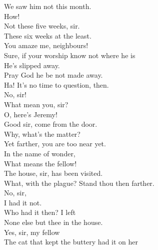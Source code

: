 \documentclass[a4paper,oneside,12pt]{memoir}
\begin{document}
\begin{drama*}
We saw him not this month.\\
\lovewitspeaks {} How!\\
\neighthreespeaks {} Not these five weeks, sir.\\
\neightwospeaks These six weeks at the least.\\
\lovewitspeaks {} You amaze me, neighbours!\\
\neighonespeaks Sure, if your worship know not where he is\\
He's slipped away.\\
\neighthreespeaks {} Pray God he be not made away.\\
\lovewitspeaks Ha! It's no time to question, then.\\
\neightwospeaks {} No, sir!\\
\facespeaks What mean you, sir?\\
\neighonespeaks
\neightwospeaks
\neighthreespeaks {}  O, here's Jeremy!\\
\facespeaks Good sir, come from the door.\\
\lovewitspeaks {} Why, what's the matter?\\
\facespeaks Yet farther, you are too near yet.\\
\lovewitspeaks {} In the name of wonder,\\
What means the fellow!\\
\facespeaks {} The house, sir, has been visited.\\
\lovewitspeaks What, with the plague? Stand thou then farther.\\
\facespeaks {} No, sir,\\
I had it not.\\
\lovewitspeaks {} Who had it then? I left\\
None else but thee in the house.\\
\facespeaks {} Yes, sir, my fellow\\
The cat that kept the buttery had it on her\\

\end{drama*}
\end{document}
